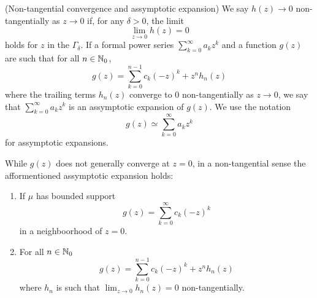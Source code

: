 \begin{definition} (Non-tangential convergence and assymptotic expansion)
  We say $h(z) \rightarrow 0$ non-tangentially as $z \rightarrow 0$ if, for any $\delta > 0$, the limit 
  \[
    \lim_{z \rightarrow 0} h(z) = 0
  \]
  holds for $z$ in the $\Gamma_\delta$. If a formal power series $\sum_{k=0}^\infty a_k z^k$ and a function $g(z)$ are such that for all $n\in \mathbb{N}_0$,
  \[
    g(z) = \sum_{k = 0}^{n-1} c_k{(-z)}^k + z^n h_n(z)
  \]
  where the trailing terms $h_n(z)$ converge to $0$ non-tangentially as $z \rightarrow 0$, we say that $\sum_{k=0}^\infty a_k z^k$ is an assymptotic expansion of $g(z)$. We use the notation
  \[
    g(z) \simeq \sum_{k=0}^\infty a_k z^k
  \]
  for assymptotic expansions.
\end{definition}

While $g(z)$ does not generally converge at $z = 0$, in a non-tangential sense the afformentioned assymptotic expansion holds:
\begin{proposition}
  \begin{enumerate}
    \item If $\mu$ has bounded support
    \[
      g(z) = \sum_{k = 0}^\infty c_k{(-z)}^k
    \]
    in a neighboorhood of $z=0$.
    \item For all $n \in \mathbb{N}_0$
    \begin{equation}
      g(z) = \sum_{k = 0}^{n-1} c_k{(-z)}^k + z^n h_n(z) \label{assexp}
    \end{equation}
    where $h_n$ is such that $\lim_{z \rightarrow 0} h_n(z) = 0$ non-tangentially.
  \end{enumerate}
\end{proposition}

